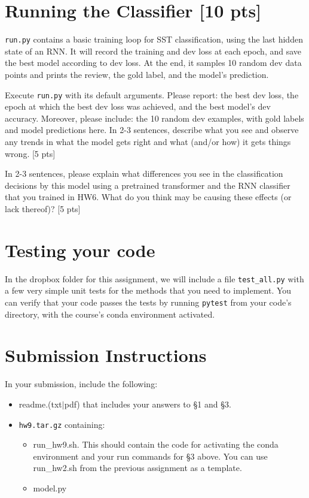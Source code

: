\documentclass[11pt]{article}
\begin{document}
\section{Running the Classifier [10 pts]}

\texttt{run.py} contains a basic training loop for SST classification, using the last hidden state of an RNN. It will record the training and dev loss at each epoch, and save the best model according to dev loss.  At the end, it samples 10 random dev data points and prints the review, the gold label, and the model's prediction.

\vspace{2em}
 Execute \texttt{run.py} with its default arguments.  Please report: the best dev loss, the epoch at which the best dev loss was achieved, and the best model's dev accuracy.  Moreover, please include: the 10 random dev examples, with gold labels and model predictions here.  In 2-3 sentences, describe what you see and observe any trends in what the model gets right and what (and/or how) it gets things wrong. \hfill [5 pts]

\vspace{2em}
 In 2-3 sentences, please explain what differences you see in the classification decisions by this model using a pretrained transformer and the RNN classifier that you trained in HW6. What do you think may be causing these effects (or lack thereof)? \hfill [5 pts]


\section{Testing your code}

In the dropbox folder for this assignment, we will include a file \texttt{test\_all.py} with a few very simple unit tests for the methods that you need to implement.  You can verify that your code passes the tests by running \texttt{pytest} from your code's directory, with the course's conda environment activated.


\section*{Submission Instructions}

In your submission, include the following:
\begin{itemize}
  \item readme.(txt$\mid$pdf) that includes your answers to \S1 and \S3. 
  \item \texttt{hw9.tar.gz} containing:
  \begin{itemize}
    \item run\_hw9.sh.  This should contain the code for activating the conda environment and your run commands for \S3 above.  You can use run\_hw2.sh from the previous assignment as a template.
    \item model.py
  \end{itemize}
\end{itemize}
\end{document}
